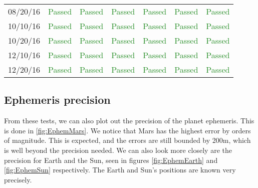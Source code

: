 \begin{table}[htbp]
\begin{tabular}{c | c | c | c | c | c | c}
      08/20/16 & \textcolor{ForestGreen}{Passed} & \textcolor{ForestGreen}{Passed} &  \textcolor{ForestGreen}{Passed}&  \textcolor{ForestGreen}{Passed} & \textcolor{ForestGreen}{Passed} &  \textcolor{ForestGreen}{Passed}\\
      10/10/16 & \textcolor{ForestGreen}{Passed} & \textcolor{ForestGreen}{Passed} &  \textcolor{ForestGreen}{Passed}&  \textcolor{ForestGreen}{Passed} & \textcolor{ForestGreen}{Passed} &  \textcolor{ForestGreen}{Passed}\\
      10/20/16 & \textcolor{ForestGreen}{Passed} & \textcolor{ForestGreen}{Passed} &  \textcolor{ForestGreen}{Passed}&  \textcolor{ForestGreen}{Passed} & \textcolor{ForestGreen}{Passed} &  \textcolor{ForestGreen}{Passed}\\
      12/10/16 & \textcolor{ForestGreen}{Passed} & \textcolor{ForestGreen}{Passed} &  \textcolor{ForestGreen}{Passed}&  \textcolor{ForestGreen}{Passed} & \textcolor{ForestGreen}{Passed} &  \textcolor{ForestGreen}{Passed}\\
      12/20/16 & \textcolor{ForestGreen}{Passed} & \textcolor{ForestGreen}{Passed} &  \textcolor{ForestGreen}{Passed}&  \textcolor{ForestGreen}{Passed} & \textcolor{ForestGreen}{Passed} &  \textcolor{ForestGreen}{Passed}\\
      \hline
   \end{tabular}
\end{table}


\subsection{Ephemeris precision}

From these tests, we can also plot out the precision of the planet ephemeris. This is done in \ref{fig:EphemMars}. We notice that Mars has the highest error by orders of magnitude. This is expected, and the errors are still bounded by 200m, which is well beyond the precision needed. We can also look more closely are the precision for Earth and the Sun, seen in figures  \ref{fig:EphemEarth} and  \ref{fig:EphemSun} respectively. The Earth and Sun's positions are known very precisely. 






